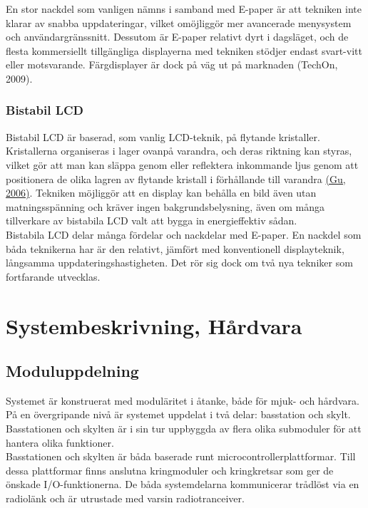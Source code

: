 \documentclass[a4paper,11pt]{article}
\begin{document}
En stor nackdel som vanligen nämns i samband med E-paper är att tekniken inte klarar av snabba uppdateringar, vilket omöjliggör mer avancerade menysystem och användargränssnitt. Dessutom är E-paper relativt dyrt i dagsläget, och de flesta kommersiellt tillgängliga displayerna med tekniken stödjer endast svart-vitt eller motsvarande. Färgdisplayer är dock på väg ut på marknaden (TechOn, 2009).

\subsubsection{Bistabil LCD}
Bistabil LCD är baserad, som vanlig LCD-teknik, på flytande kristaller. Kristallerna organiseras i lager ovanpå varandra, och deras riktning kan styras, vilket gör att man kan släppa genom eller reflektera inkommande ljus genom att positionera de olika lagren av flytande kristall i förhållande till varandra \hyperref[mingu]{(Gu, 2006)}. Tekniken möjliggör att en display kan behålla en bild även utan matningsspänning och kräver ingen bakgrundsbelysning, även om många tillverkare av bistabila LCD valt att bygga in energieffektiv sådan.\\

Bistabila LCD delar många fördelar och nackdelar med E-paper. En nackdel som båda teknikerna har är den relativt, jämfört med konventionell displayteknik, långsamma uppdateringshastigheten. Det rör sig dock om två nya tekniker som fortfarande utvecklas.

\section{Systembeskrivning, Hårdvara}

\subsection{Moduluppdelning}
Systemet är konstruerat med moduläritet i åtanke, både för mjuk- och hårdvara. På en övergripande nivå är systemet uppdelat i två delar: basstation och skylt. Basstationen och skylten är i sin tur uppbyggda av flera olika submoduler för att hantera olika funktioner. \\

Basstationen och skylten är båda baserade runt microcontrollerplattformar. Till dessa plattformar finns anslutna kringmoduler och kringkretsar som ger de önskade I/O-funktionerna. De båda systemdelarna kommunicerar trådlöst via en radiolänk och är utrustade med varsin radiotranceiver.
\end{document}
